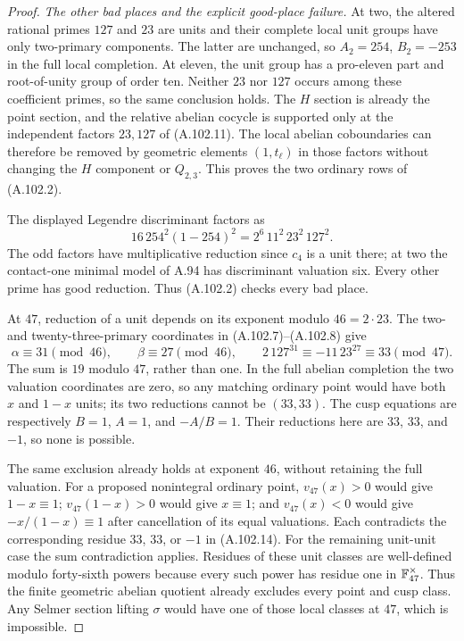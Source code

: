 \begin{proof}
\emph{The other bad places and the explicit good-place failure.}
At two, the altered rational primes $127$ and $23$
are units and their complete local unit groups
have only two-primary components.  The latter
are unchanged, so $A_2=254$, $B_2=-253$ in
the full local completion.
At eleven, the unit group has a pro-eleven part
and root-of-unity group of order ten.
Neither $23$ nor $127$ occurs among these
coefficient primes, so the same conclusion holds.
The $H$ section is already the point section,
and the relative abelian cocycle is supported
only at the independent factors $23,127$ of
(A.102.11).  The local abelian coboundaries can
therefore be removed by geometric elements
$(1,t_\ell)$ in those factors without changing
the $H$ component or $Q_{2,3}$.
This proves the two ordinary rows of (A.102.2).

The displayed Legendre discriminant factors as
\[
       16\,254^2(1-254)^2=2^6\,11^2\,23^2\,127^2.
\tag{A.102.13}
\]
The odd factors have multiplicative reduction
since $c_4$ is a unit there; at two the
contact-one minimal model of A.94 has
discriminant valuation six.
Every other prime has good reduction.
Thus (A.102.2) checks every bad place.

At $47$, reduction of a unit depends on its
exponent modulo $46=2\cdot23$.
The two- and twenty-three-primary coordinates
in (A.102.7)--(A.102.8) give
\[
    \alpha\equiv31\pmod{46},\qquad
    \beta\equiv27\pmod{46},\qquad
    2\,127^{31}\equiv-11\,23^{27}\equiv33\pmod{47}.
\tag{A.102.14}
\]
The sum is $19$ modulo $47$, rather than one.
In the full abelian completion the two valuation
coordinates are zero, so any matching ordinary
point would have both $x$ and $1-x$ units;
its two reductions cannot be $(33,33)$.
The cusp equations are respectively $B=1$,
$A=1$, and $-A/B=1$.  Their reductions here
are $33$, $33$, and $-1$, so none is possible.

The same exclusion already holds at exponent
$46$, without retaining the full valuation.
For a proposed nonintegral ordinary point,
$v_{47}(x)>0$ would give $1-x\equiv1$;
$v_{47}(1-x)>0$ would give $x\equiv1$;
and $v_{47}(x)<0$ would give
$-x/(1-x)\equiv1$ after cancellation of its
equal valuations.
Each contradicts the corresponding residue
$33$, $33$, or $-1$ in (A.102.14).
For the remaining unit-unit case the sum
contradiction applies.  Residues of these
unit classes are well-defined modulo
forty-sixth powers because every such power
has residue one in $\mathbb F_{47}^\times$.
Thus the finite geometric abelian quotient
already excludes every point and cusp class.
Any Selmer section lifting $\sigma$ would
have one of those local classes at $47$,
which is impossible.


\end{proof}
